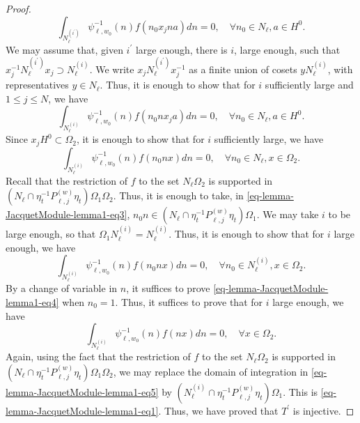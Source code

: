 \documentclass[12pt]{amsart}
\theoremstyle{remark}
\begin{document}
\begin{proof}
\begin{equation*}
\int_{N_{\ell}^{(i^\prime)}} \psi_{\ell,w_0}^{-1}(n)f( n_0   x_j n a) dn=0, \quad \forall n_0\in N_{\ell}, a\in H^0. 
\end{equation*}
We may assume that, given $i^\prime$ large enough, there is $i$, large enough, such that $x_j^{-1} N_{\ell}^{(i^\prime)} x_j \supset N_{\ell}^{(i)}$. We write $x_j N_{\ell}^{(i^\prime)} x_j^{-1}$ as a finite union of cosets $y N_{\ell}^{(i)}$,  with representatives $y\in N_{\ell}$. Thus, it is enough to show that for $i$ sufficiently large and $1\le j \le N$, we have
\begin{equation*}
\int_{N_{\ell}^{(i)}} \psi_{\ell,w_0}^{-1}(n)f( n_0  n x_j  a) dn=0, \quad \forall n_0\in N_{\ell}, a\in H^0. 
\end{equation*}
Since $x_jH^0\subset \Omega_2$, it is enough to show that for $i$ sufficiently large, we have
\begin{equation}
\label{eq-lemma-JacquetModule-lemma1-eq3}
\int_{N_{\ell}^{(i)}} \psi_{\ell,w_0}^{-1}(n)f( n_0  n x) dn=0, \quad \forall n_0\in N_{\ell}, x\in \Omega_2. 
\end{equation}
Recall that the restriction of $f$ to the set $N_{\ell}\Omega_2$ is supported in $(N_{\ell}\cap \eta_t^{-1} P_{\ell,j}^{(w)}\eta_t)\Omega_1 \Omega_2$. Thus, it is enough to take, in \eqref{eq-lemma-JacquetModule-lemma1-eq3}, $n_0 n\in (N_{\ell}\cap \eta_t^{-1} P_{\ell,j}^{(w)}\eta_t)\Omega_1$. We may take $i$ to be large enough, so that $\Omega_1 N_{\ell}^{(i)}=N_{\ell}^{(i)}$. Thus, it is enough to show that for $i$ large enough, we have
\begin{equation}
\label{eq-lemma-JacquetModule-lemma1-eq4}
\int_{N_{\ell}^{(i)}} \psi_{\ell,w_0}^{-1}(n)f( n_0  n x) dn=0, \quad \forall n_0\in N_{\ell}^{(i)}, x\in \Omega_2. 
\end{equation}
By a change of variable in $n$, it suffices to prove \eqref{eq-lemma-JacquetModule-lemma1-eq4} when $n_0=1$. Thus, it suffices to prove that for $i$ large enough, we have
\begin{equation}
\label{eq-lemma-JacquetModule-lemma1-eq5}
\int_{N_{\ell}^{(i)}} \psi_{\ell,w_0}^{-1}(n)f(    n x) dn=0, \quad \forall   x\in \Omega_2. 
\end{equation}
Again, using the fact that the restriction of $f$ to the set $N_{\ell}\Omega_2$ is supported in $(N_{\ell}\cap \eta_t^{-1} P_{\ell,j}^{(w)}\eta_t)\Omega_1 \Omega_2$, we may replace the domain of integration in \eqref{eq-lemma-JacquetModule-lemma1-eq5} by $(N_{\ell}^{(i)}\cap \eta_t^{-1} P_{\ell,j}^{(w)}\eta_t)\Omega_1$. This is \eqref{eq-lemma-JacquetModule-lemma1-eq1}. Thus, we have proved that $T^\prime$ is injective. 


\end{proof}
\end{document}
